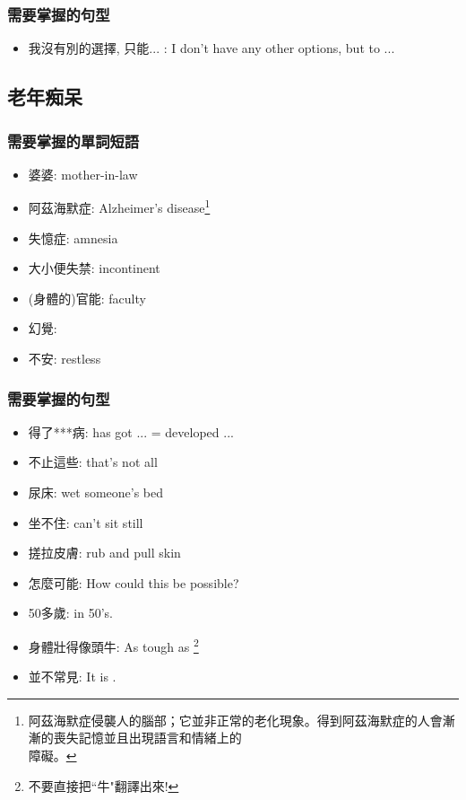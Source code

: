 \subsubsection*{需要掌握的句型}
\begin{itemize}
  \itemsep0em
  \item 我沒有別的選擇, 只能... : I don't have any other options, but to ...
\end{itemize}

\subsection{老年痴呆}
\subsubsection*{需要掌握的單詞短語}
\begin{multicols}{2}
\begin{itemize}
  \itemsep0em
  \item 婆婆: mother-in-law
  \item 阿茲海默症: Alzheimer's disease\footnote{阿茲海默症侵襲人的腦部；它並非正常的老化現象。得到阿茲海默症的人會漸漸的喪失記憶並且出現語言和情緒上的\\障礙。}
  \item 失憶症: amnesia
  \item 大小便失禁: incontinent
  \item (身體的)官能: faculty
  \item 幻覺: 
  \item 不安: restless
\end{itemize}
\end{multicols}

\subsubsection*{需要掌握的句型}
\begin{multicols}{2}
\begin{itemize}
  \itemsep0em
  \item 得了***病: has got ... = developed ...
  \item 不止這些: that's not all
  \item 尿床: wet someone's bed
  \item 坐不住: can't sit still
  \item 搓拉皮膚: rub and pull skin
  \item 怎麼可能: How could this be possible?
  \item 50多歲: in 50's.
  \item 身體壯得像頭牛: As tough as \footnote{不要直接把``牛"翻譯出來!}
  \item 並不常見: It is .
\end{itemize}
\end{multicols}

